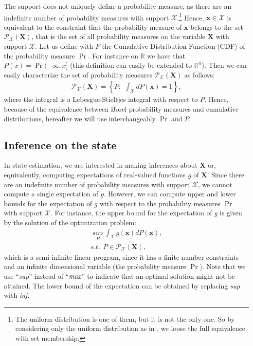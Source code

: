 \documentclass[twocolumn]{autart}
\newcommand{\DP}[1]{{#1}}
\begin{document}
The support does not uniquely define a probability measure, as  there  \DP{are an indefinite number of probability measures} with support $\mathcal{X}$.\footnote{The uniform distribution is one of them, but it is not the only one. So by considering only the uniform distribution as in \cite{Canti6693825}, we loose the full equivalence with set-membership.} Hence,
  $\mathbf{x}\in \mathcal{X}$ is equivalent to the constraint
that the probability measure of $\mathbf{x}$ belongs to the set  $\mathcal{P}_{\mathcal{X}}(\mathbf{X})$,
that is the set of all probability measures on the variable $\mathbf{X}$  with support $ \mathcal{X}$.
Let us define with $P$ the Cumulative Distribution Function (CDF) of the probability measure $\Pr$.
For instance on $\mathbb{R}$ we have that $P(x)=\Pr(-\infty,x]$ (this definition can easily be extended to $\mathbb{R}^n$).
Then we can easily characterize the set of probability measures $\mathcal{P}_{\mathcal{X}}(\mathbf{X})$ as follows:
\begin{equation}
\label{eq:probconstr0}
\begin{array}{l}
\mathcal{P}_{\mathcal{X}}(\mathbf{X})=\left\{P: ~~\int_{\mathcal{X}} dP(\mathbf{x})=1\right\},
 \end{array}
\end{equation}
where the integral is a Lebesgue-Stieltjes integral \DP{with respect to}  $P$. Hence, because
of the equivalence between Borel probability measures and cumulative distributions,
hereafter we will use  interchangeably $\Pr$ and $P$.


\subsection{Inference on the state}
In state estimation, we are interested in making inferences about $\mathbf{X}$
or, equivalently, computing expectations of real-valued functions $g$ of $\mathbf{X}$.
Since there \DP{are an indefinite number of probability measures} with support $ \mathcal{X}$, we cannot compute
a single expectation of $g$. However, we can compute upper and lower \DP{bounds} for the expectation of $g$ \DP{with respect to}  the probability measures $\Pr$ with support $ \mathcal{X}$. For instance, the upper bound for the  expectation of $g$ is given by the solution of the optimization problem:
 \begin{equation}
\label{eq:probconstroptim}
\begin{array}{l}
\sup\limits_{P} \int_{\mathcal{X}} g(\mathbf{x}) dP(\mathbf{x}),\\
s.t.~~P \in \mathcal{P}_{\mathcal{X}}(\mathbf{X}),
 \end{array}
\end{equation}
which is a semi-infinite linear program, since it has a finite number constraints
and an infinite dimensional variable (the probability measure $\Pr$).
Note that we use ``\emph{sup}'' instead of ``$\emph{max}$'' to indicate that an optimal solution might not be attained.
The lower bound of the expectation can be obtained by replacing \emph{sup} with \emph{inf}.
\end{document}
